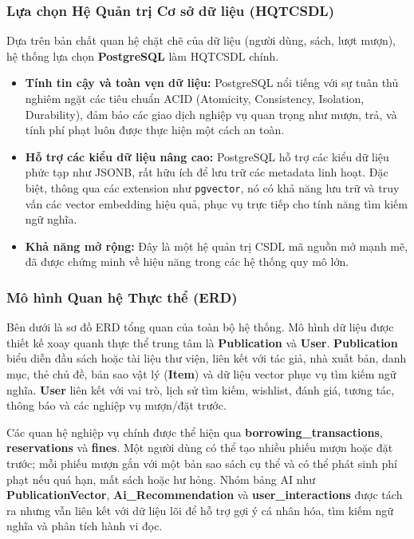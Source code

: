 \subsubsection{Lựa chọn Hệ Quản trị Cơ sở dữ liệu (HQTCSDL)}
Dựa trên bản chất quan hệ chặt chẽ của dữ liệu (người dùng, sách, lượt mượn), hệ thống lựa chọn \textbf{PostgreSQL} làm HQTCSDL chính.
\begin{itemize}
 \item \textbf{Tính tin cậy và toàn vẹn dữ liệu:} PostgreSQL nổi tiếng với sự tuân thủ nghiêm ngặt các tiêu chuẩn ACID (Atomicity, Consistency, Isolation, Durability), đảm bảo các giao dịch nghiệp vụ quan trọng như mượn, trả, và tính phí phạt luôn được thực hiện một cách an toàn.
 \item \textbf{Hỗ trợ các kiểu dữ liệu nâng cao:} PostgreSQL hỗ trợ các kiểu dữ liệu phức tạp như JSONB, rất hữu ích để lưu trữ các metadata linh hoạt. Đặc biệt, thông qua các extension như \texttt{pgvector}, nó có khả năng lưu trữ và truy vấn các vector embedding hiệu quả, phục vụ trực tiếp cho tính năng tìm kiếm ngữ nghĩa.
 \item \textbf{Khả năng mở rộng:} Đây là một hệ quản trị CSDL mã nguồn mở mạnh mẽ, đã được chứng minh về hiệu năng trong các hệ thống quy mô lớn.
\end{itemize}

\subsubsection{Mô hình Quan hệ Thực thể (ERD)}
Bên dưới là sơ đồ ERD tổng quan của toàn bộ hệ thống. Mô hình dữ liệu được
thiết kế xoay quanh thực thể trung tâm là \textbf{Publication} và
\textbf{User}. \textbf{Publication} biểu diễn đầu sách hoặc tài liệu thư viện,
liên kết với tác giả, nhà xuất bản, danh mục, thẻ chủ đề, bản sao vật lý
(\textbf{Item}) và dữ liệu vector phục vụ tìm kiếm ngữ nghĩa. \textbf{User}
liên kết với vai trò, lịch sử tìm kiếm, wishlist, đánh giá, tương tác, thông
báo và các nghiệp vụ mượn/đặt trước.

Các quan hệ nghiệp vụ chính được thể hiện qua \textbf{borrowing\_transactions},
\textbf{reservations} và \textbf{fines}. Một người dùng có thể tạo nhiều phiếu
mượn hoặc đặt trước; mỗi phiếu mượn gắn với một bản sao sách cụ thể và có thể
phát sinh phí phạt nếu quá hạn, mất sách hoặc hư hỏng. Nhóm bảng AI như
\textbf{PublicationVector}, \textbf{Ai\_Recommendation} và
\textbf{user\_interactions} được tách ra nhưng vẫn liên kết với dữ liệu lõi để
hỗ trợ gợi ý cá nhân hóa, tìm kiếm ngữ nghĩa và phân tích hành vi đọc.

